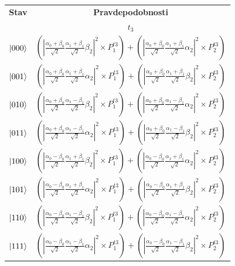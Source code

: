 \begin{table}
\centering
\begin{tabular}{|c|c|}
\hline
\textbf{Stav} & \textbf{Pravdepodobnosti} \\
 & \(t_3\) \\
\hline
\(\ket{000}\) &
\((|\frac{\alpha_0 + \beta_0}{\sqrt{2}} \frac{\alpha_1 + \beta_1}{\sqrt{2}} \beta_2|^2 \times P^{t3}_1) + (|\frac{\alpha_0 + \beta_0}{\sqrt{2}} \frac{\alpha_1 + \beta_1}{\sqrt{2}} \alpha_2|^2 \times P^{t3}_2)\)  \\

\(\ket{001}\) & 
\((|\frac{\alpha_0 + \beta_0}{\sqrt{2}} \frac{\alpha_1 + \beta_1}{\sqrt{2}} \alpha_2|^2 \times P^{t3}_1) + (|\frac{\alpha_0 + \beta_0}{\sqrt{2}} \frac{\alpha_1 + \beta_1}{\sqrt{2}} \beta_2|^2 \times P^{t3}_2)\)  \\

\(\ket{010}\) & 
\((|\frac{\alpha_0 + \beta_0}{\sqrt{2}} \frac{\alpha_1 - \beta_1}{\sqrt{2}} \beta_2|^2 \times P^{t3}_1) + (|\frac{\alpha_0 + \beta_0}{\sqrt{2}} \frac{\alpha_1 - \beta_1}{\sqrt{2}} \alpha_2|^2 \times P^{t3}_2)\)  \\

\(\ket{011}\) & 
\((|\frac{\alpha_0 + \beta_0}{\sqrt{2}} \frac{\alpha_1 - \beta_1}{\sqrt{2}} \alpha_2|^2 \times P^{t3}_1) + (|\frac{\alpha_0 + \beta_0}{\sqrt{2}} \frac{\alpha_1 - \beta_1}{\sqrt{2}} \beta_2|^2 \times P^{t3}_2)\)  \\

\(\ket{100}\) & 
\((|\frac{\alpha_0 - \beta_0}{\sqrt{2}} \frac{\alpha_1 + \beta_1}{\sqrt{2}} \beta_2|^2 \times P^{t3}_1) + (|\frac{\alpha_0 - \beta_0}{\sqrt{2}} \frac{\alpha_1 + \beta_1}{\sqrt{2}} \alpha_2|^2 \times P^{t3}_2)\)  \\

\(\ket{101}\) & 
\((|\frac{\alpha_0 - \beta_0}{\sqrt{2}} \frac{\alpha_1 + \beta_1}{\sqrt{2}} \alpha_2|^2 \times P^{t3}_1) + (|\frac{\alpha_0 - \beta_0}{\sqrt{2}} \frac{\alpha_1 + \beta_1}{\sqrt{2}} \beta_2|^2 \times P^{t3}_2)\)  \\

\(\ket{110}\) & 
\((|\frac{\alpha_0 - \beta_0}{\sqrt{2}} \frac{\alpha_1 - \beta_1}{\sqrt{2}} \beta_2|^2 \times P^{t3}_1) + (|\frac{\alpha_0 - \beta_0}{\sqrt{2}} \frac{\alpha_1 - \beta_1}{\sqrt{2}} \alpha_2|^2 \times P^{t3}_2)\)  \\

\(\ket{111}\) & 
\((|\frac{\alpha_0 - \beta_0}{\sqrt{2}} \frac{\alpha_1 - \beta_1}{\sqrt{2}} \alpha_2|^2 \times P^{t3}_1) + (|\frac{\alpha_0 - \beta_0}{\sqrt{2}} \frac{\alpha_1 - \beta_1}{\sqrt{2}} \beta_2|^2 \times P^{t3}_2)\)  \\
\hline


\end{tabular}
\end{table}
